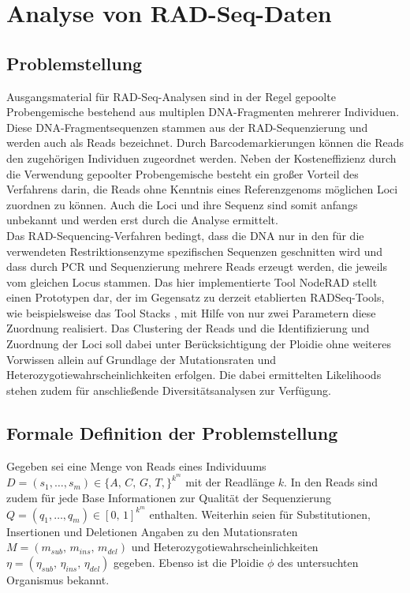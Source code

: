 \chapter{Analyse von RAD-Seq-Daten} \label{chapter:kap2}
\section{Problemstellung} \label{sec:probl}

Ausgangsmaterial für RAD-Seq-Analysen sind in der Regel gepoolte Probengemische bestehend aus multiplen DNA-Fragmenten mehrerer Individuen. Diese DNA-Fragmentsequenzen stammen aus der RAD-Sequenzierung und werden auch als Reads bezeichnet. Durch Barcodemarkierungen können die Reads den zugehörigen Individuen zugeordnet werden. Neben der Kosteneffizienz durch die Verwendung gepoolter Probengemische besteht ein großer Vorteil des Verfahrens darin, die Reads ohne Kenntnis eines Referenzgenoms möglichen Loci zuordnen zu können. Auch die Loci und ihre Sequenz sind somit anfangs unbekannt und werden erst durch die Analyse ermittelt.\\

Das RAD-Sequencing-Verfahren bedingt, dass die DNA nur in den für die verwendeten Restriktionsenzyme spezifischen Sequenzen geschnitten wird und dass durch PCR und Sequenzierung mehrere Reads erzeugt werden, die jeweils vom gleichen Locus stammen. Das hier implementierte Tool NodeRAD stellt einen Prototypen dar, der im Gegensatz zu derzeit etablierten RADSeq-Tools, wie beispielsweise das Tool Stacks \cite{catchen_2013}, mit Hilfe von nur zwei Parametern diese Zuordnung realisiert. Das Clustering der Reads und die Identifizierung und Zuordnung der Loci soll dabei unter Berücksichtigung der Ploidie ohne weiteres Vorwissen allein auf Grundlage der Mutationsraten und  Heterozygotiewahrscheinlichkeiten erfolgen. Die dabei ermittelten Likelihoods stehen zudem für anschließende Diversitätsanalysen zur Verfügung.

\section{Formale Definition der Problemstellung} \label{sec:formal}

Gegeben sei eine Menge von Reads eines Individuums $ D = (s_{1}, \dots , s_{m}) \in \{A,\,C,\,G,\,T,\}^{k^m}$ mit der Readlänge $k$. In den Reads sind zudem für jede Base Informationen zur Qualität der Sequenzierung $ Q = (q_{1}, \dots , q_{m}) \in {[0,\,1]}^{k^m}$ enthalten. Weiterhin seien für Substitutionen, Insertionen und Deletionen Angaben zu den Mutationsraten $M=(m_{sub},\, m_{ins},\, m_{del})$ und Heterozygotiewahrscheinlichkeiten $\eta = (\eta_{sub},\, \eta_{ins},\, \eta_{del}) $ gegeben. Ebenso ist die Ploidie $\phi$ des untersuchten Organismus bekannt. \\

